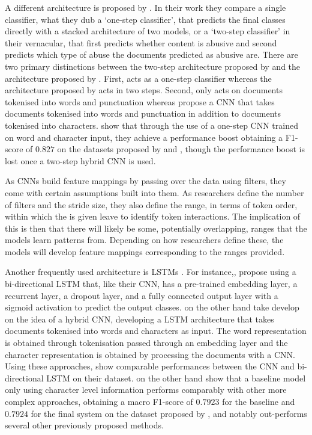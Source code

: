 A different architecture is proposed by \citet{Park:2017}. In their work they compare a single classifier, what they dub a `one-step classifier', that predicts the final classes directly with a stacked architecture of two models, or a `two-step classifier' in their vernacular, that first predicts whether content is abusive and second predicts which type of abuse the documents predicted as abusive are. There are two primary distinctions between the two-step architecture proposed by \citet{Park:2017} and the architecture proposed by \citet{Kolhatkar:2021}. First, \citet{Kolhatkar:2021} acts as a one-step classifier whereas the architecture proposed by \citet{Park:2017} acts in two steps. Second, \citet{Kolhatkar:2021} only acts on documents tokenised into words and punctuation whereas \citet{Park:2017} propose a CNN that takes documents tokenised into words and punctuation in addition to documents tokenised into characters. \citet{Park:2017} show that through the use of a one-step CNN trained on word and character input, they achieve a performance boost obtaining a F1-score of $0.827$ on the datasets proposed by \citet{Waseem-Hovy:2016} and \citet{Waseem:2016}, though the performance boost is lost once a two-step hybrid CNN is used.

As CNNs build feature mappings by passing over the data using filters, they come with certain assumptions built into them. As researchers define the number of filters and the stride size, they also define the range, in terms of token order, within which the is given leave to identify token interactions. The implication of this is then that there will likely be some, potentially overlapping, ranges that the models learn patterns from. Depending on how researchers define these, the models will develop feature mappings corresponding to the ranges provided.

Another frequently used architecture is LSTMs \citep{Badjatiya:2017,Kolhatkar:2021,Meyer:2019}. For instance,, \citet{Kolhatkar:2021} propose using a bi-directional LSTM that, like their CNN, has a pre-trained embedding layer, a recurrent layer, a dropout layer, and a fully connected output layer with a sigmoid activation to predict the output classes. \citet{Meyer:2019} on the other hand take develop on the idea of a hybrid CNN, developing a LSTM architecture that takes documents tokenised into words and characters as input. The word representation is obtained through tokenisation passed through an embedding layer and the character representation is obtained by processing the documents with a CNN.
Using these approaches, \citet{Kolhatkar:2021} show comparable performances between the CNN and bi-directional LSTM on their dataset. \citet{Meyer:2019} on the other hand show that a baseline model only using character level information performs comparably with other more complex approaches, obtaining a macro F1-score of $0.7923$ for the baseline and $0.7924$ for the final system on the dataset proposed by \citet{Waseem-Hovy:2016}, and notably out-performs several other previously proposed methods.

